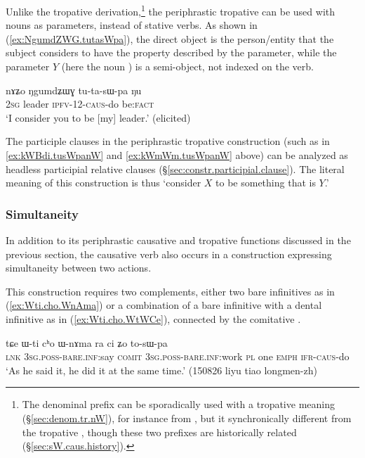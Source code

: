Unlike the  tropative derivation,\footnote{The  denominal prefix can be sporadically used with a tropative meaning (§\ref{sec:denom.tr.nW}), for instance   from , but it synchronically different from the tropative , though these two prefixes are historically related (§\ref{sec:sW.caus.history}). } the  periphrastic tropative can be used with nouns as parameters, instead of stative verbs. As shown in (\ref{ex:NgumdZWG.tutasWpa}), the direct object is the person/entity that the subject considers to have the property described by the parameter, while the parameter $Y$ (here the noun ) is a semi-object, not indexed on the verb.

\begin{exe}
\ex \label{ex:NgumdZWG.tutasWpa}
\gll nɤʑo ŋgumdʑɯɣ tu-ta-sɯ-pa ŋu \\
\textsc{2sg} leader \textsc{ipfv}-1\fl{}2-\textsc{caus}-do be:\textsc{fact} \\
\glt `I consider you to be [my] leader.' (elicited)
\end{exe}

The participle clauses in the periphrastic tropative construction (such as in \ref{ex:kWBdi.tusWpanW} and \ref{ex:kWmWm.tusWpanW} above) can be analyzed as headless participial relative clauses (§\ref{sec:constr.participial.clause}). The literal meaning of this construction is thus `consider $X$ to be something that is $Y$.' 


\subsubsection{Simultaneity} \label{sec:bare.dental.inf.sWpa}
In addition to its periphrastic causative and tropative functions discussed in the previous section, the causative verb  also occurs in a construction expressing simultaneity between two actions. 

This construction requires two complements, either two bare infinitives as in (\ref{ex:Wti.cho.WnAma}) or a combination of a bare infinitive with a dental infinitive as in (\ref{ex:Wti.cho.WtWCe}), connected by the comitative .

\begin{exe} 
\ex \label{ex:Wti.cho.WnAma}
\gll tɕe ɯ-ti cʰo ɯ-nɤma ra ci ʑo to-sɯ-pa \\
\textsc{lnk} \textsc{3sg}.\textsc{poss}-\textsc{bare}.\textsc{inf}:say \textsc{comit} \textsc{3sg}.\textsc{poss}-\textsc{bare}.\textsc{inf}:work \textsc{pl} one \textsc{emph} \textsc{ifr}-\textsc{caus}-do \\
\glt `As he said it, he did it at the same time.' (150826 liyu tiao longmen-zh)
\end{exe} 

